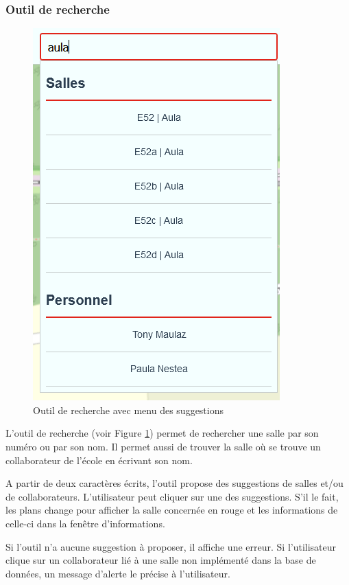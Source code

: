 \documentclass[
    iai, %
    il, %
]{heig-tb}
\begin{document}
\subsubsection{Outil de recherche}

\begin{figure}[h]
    \centering
    \includegraphics[scale=0.5]{frontend-recherche.png}
    \caption{Outil de recherche avec menu des suggestions}
    \label{fig:recherche}
\end{figure}


L'outil de recherche (voir Figure \ref{fig:recherche}) permet de rechercher une salle par son numéro ou par son nom.
Il permet aussi de trouver la salle où se trouve un collaborateur de l'école en écrivant son nom.

A partir de deux caractères écrits, l'outil propose des suggestions de salles et/ou de collaborateurs.
L'utilisateur peut cliquer sur une des suggestions.
S'il le fait, les plans change pour afficher la salle concernée en rouge et les informations de celle-ci dans la fenêtre d'informations.

Si l'outil n'a aucune suggestion à proposer, il affiche une erreur.
Si l'utilisateur clique sur un collaborateur lié à une salle non implémenté dans la base de données,
un message d'alerte le précise à l'utilisateur.
\end{document}
